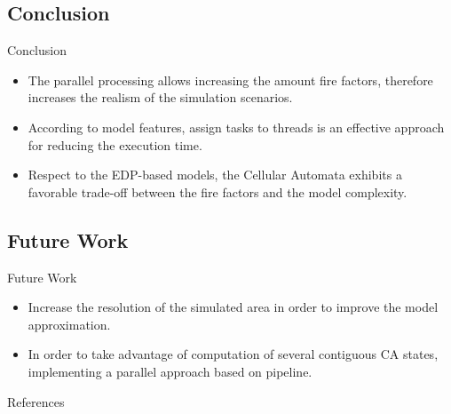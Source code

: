 \documentclass{beamer}
\begin{document}
      \subsection{Conclusion}
        \begin{frame}{Conclusion}
          \begin{itemize}
            \item<1-> The parallel processing allows increasing the amount fire factors, therefore
              increases the realism of the simulation scenarios.
            \item<2-> According to model features, assign tasks to threads is an effective approach for reducing the execution time.
            \item<3-> Respect to the EDP-based models, the Cellular Automata exhibits a favorable trade-off between the fire factors and the model complexity.
          \end{itemize}
        \end{frame}
      
      \subsection{Future Work}
      \begin{frame}{Future Work}
        \begin{itemize}
          \item<1-> Increase the resolution of the simulated area in order to improve the model approximation.
          \item<2-> In order to take advantage of computation of several contiguous CA states, implementing
            a parallel approach based on pipeline.
        \end{itemize}
      \end{frame}
      
  \begin{frame}{References}
    
    
  \end{frame}
     
\end{document}
